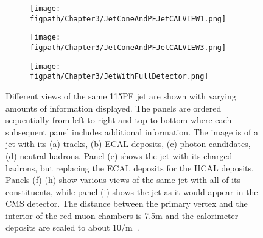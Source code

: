 \begin{figure}[!hbt]
    \begin{subfigure}[t]{0.32\textwidth}
        \texttt{[image: \\figpath/Chapter3/JetConeAndPFJetCALVIEW1.png]}
        \caption{}
        \label{fig:jc_PFjet1}
    \end{subfigure}
    \begin{subfigure}[t]{0.32\textwidth}
        \texttt{[image: \\figpath/Chapter3/JetConeAndPFJetCALVIEW3.png]}
        \caption{}
        \label{fig:jc_PFJet3}
    \end{subfigure}
    \begin{subfigure}[t]{0.32\textwidth}
        \texttt{[image: \\figpath/Chapter3/JetWithFullDetector.png]}
        \caption{}
        \label{fig:jet_fullDetector}
    \end{subfigure}
    \caption{Different views of the same 115\gev PF jet are shown with varying amounts of information displayed. The panels are ordered sequentially from left to right and top to bottom where each subsequent panel includes additional information. The image is of a jet with its (a) tracks, (b) ECAL deposits, (c) photon candidates, (d) neutral hadrons. Panel (e) shows the jet with its charged hadrons, but replacing the ECAL deposits for the HCAL deposits. Panels (f)-(h) show various views of the same jet with all of its constituents, while panel (i) shows the jet as it would appear in the CMS detector. The distance between the primary vertex and the interior of the red muon chambers is 7.5\unit{m} and the calorimeter deposits are scaled to about 10\unit{\gev/m}~\cite{Dorney2014}.}
    \label{fig:BuildingAPFJet}
\end{figure}


